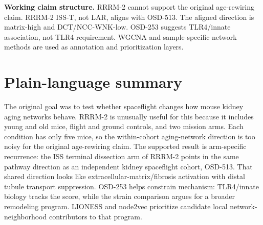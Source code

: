 \documentclass[11pt]{article}
\begin{document}
\vspace{0.8em}
\noindent\textbf{Working claim structure.}
RRRM-2 cannot support the original age-rewiring claim. RRRM-2 ISS-T, not LAR, aligns with OSD-513. The aligned direction is matrix-high and DCT/NCC-WNK-low. OSD-253 suggests TLR4/innate association, not TLR4 requirement. WGCNA and sample-specific network methods are used as annotation and prioritization layers.

\clearpage

\section*{Plain-language summary}

\noindent
The original goal was to test whether spaceflight changes how mouse kidney aging networks behave. RRRM-2 is unusually useful for this because it includes young and old mice, flight and ground controls, and two mission arms. Each condition has only five mice, so the within-cohort aging-network direction is too noisy for the original age-rewiring claim. The supported result is arm-specific recurrence: the ISS terminal dissection arm of RRRM-2 points in the same pathway direction as an independent kidney spaceflight cohort, OSD-513. That shared direction looks like extracellular-matrix/fibrosis activation with distal tubule transport suppression. OSD-253 helps constrain mechanism: TLR4/innate biology tracks the score, while the strain comparison argues for a broader remodeling program. LIONESS and node2vec prioritize candidate local network-neighborhood contributors to that program.

\vspace{0.8em}
\end{document}
